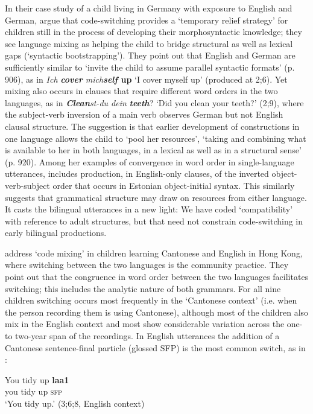 \documentclass[output=paper]{langscibook}
\begin{document}
In their case study of a child living in Germany with exposure to English and German, \citet{Gawlitzek-MaiwaldTracy1996} argue that code-switching provides a ‘temporary relief strategy’ for children still in the process of developing their morphosyntactic knowledge; they see language mixing as helping the child to bridge structural as well as lexical gaps (‘syntactic bootstrapping’). They point out that English and German are sufficiently similar to ‘invite the child to assume parallel syntactic formats’ (p. 906), as in \textit{Ich} \textbf{\textit{cover} }\textit{mich}\textbf{\textit{self} \textbf{up} }‘I cover myself up’ (produced at 2;6). Yet mixing also occurs in clauses that require different word orders in the two languages, as in \textbf{\textit{Clean}}\textit{st-du dein} \textbf{\textit{teeth}}? ‘Did you clean your teeth?’ (2;9), where the subject-verb inversion of a main verb observes German but not English clausal structure. The suggestion is that earlier development of constructions in one language allows the child to ‘pool her resources’, ‘taking and combining what is available to her in both languages, in a lexical as well as in a structural sense’ (p. 920). Among her examples of convergence in word order in single-language utterances, \citet{Vihman2018} includes production, in English-only clauses, of the inverted object-verb-subject order that occurs in Estonian object-initial syntax. This similarly suggests that grammatical structure may draw on resources from either language. It casts the bilingual utterances in a new light: We have coded ‘compatibility’ with reference to adult structures, but that need not constrain code-switching in early bilingual productions. 

\citet{YipMatthews2016} address ‘code mixing’ in children learning Cantonese and English in Hong Kong, where switching between the two languages is the community practice. They point out that the congruence in word order between the two languages facilitates switching; this includes the analytic nature of both grammars. For all nine children switching occurs most frequently in the ‘Cantonese context’ (i.e. when the person recording them is using Cantonese), although most of the children also mix in the English context and most show considerable variation across the one- to two-year span of the recordings. In English utterances the addition of a Cantonese sentence-final particle (glossed SFP) is the most common switch, as in :

\ea%
    \label{ex:vihmannvihmann:4}
\gll      You   tidy   up \textbf{{laa1}}\footnotemark{}\\
you   tidy   up   \textsc{sfp}\\
\glt `You tidy up.' (3;6;8, English context)
\z
\end{document}
